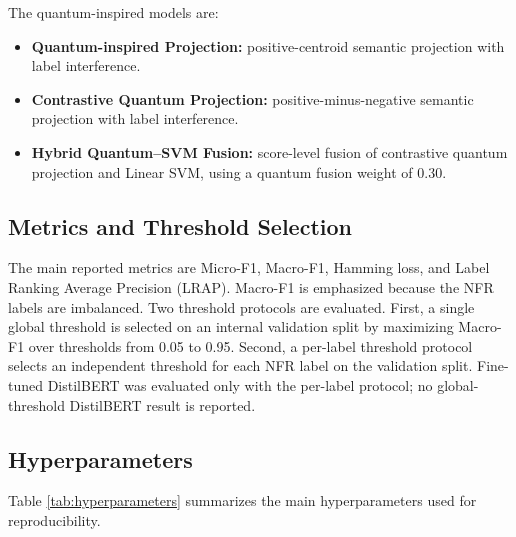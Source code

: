\documentclass[runningheads]{llncs}
\begin{document}
The quantum-inspired models are:
\begin{itemize}
    \item \textbf{Quantum-inspired Projection:} positive-centroid semantic projection with label interference.
    \item \textbf{Contrastive Quantum Projection:} positive-minus-negative semantic projection with label interference.
    \item \textbf{Hybrid Quantum--SVM Fusion:} score-level fusion of contrastive quantum projection and Linear SVM, using a quantum fusion weight of 0.30.
\end{itemize}

\subsection{Metrics and Threshold Selection}
The main reported metrics are Micro-F1, Macro-F1, Hamming loss, and Label
Ranking Average Precision (LRAP). Macro-F1 is emphasized because the NFR labels
are imbalanced. Two threshold protocols are evaluated. First, a single global
threshold is selected on an internal validation split by maximizing Macro-F1
over thresholds from 0.05 to 0.95. Second, a per-label threshold protocol
selects an independent threshold for each NFR label on the validation split.
Fine-tuned DistilBERT was evaluated only with the per-label protocol; no
global-threshold DistilBERT result is reported.

\subsection{Hyperparameters}
Table \ref{tab:hyperparameters} summarizes the main hyperparameters used for
reproducibility.
\end{document}
